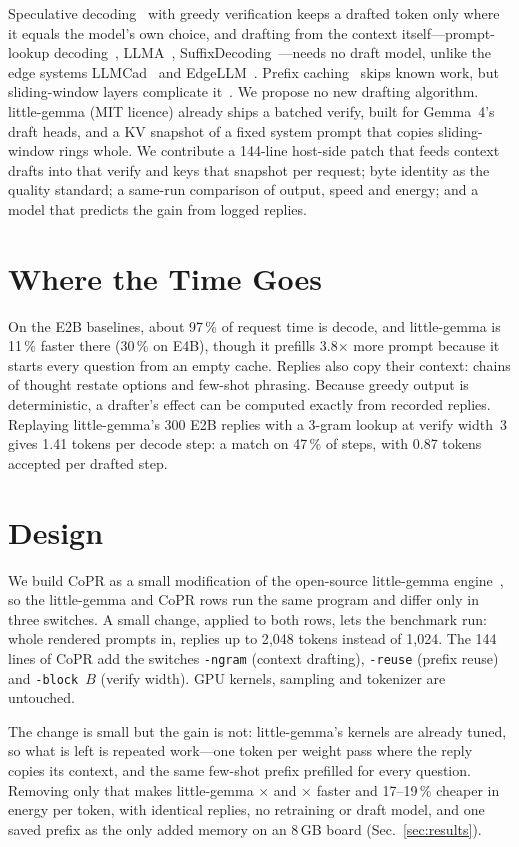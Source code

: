 \documentclass[lettersize,journal]{IEEEtran}
\newcommand{\sys}{CoPR}
\newcommand{\lgm}{little-gemma}
\begin{document}
Speculative decoding~\cite{leviathan2023,chen2023} with greedy verification keeps
a drafted token only where it equals the model's own choice, and drafting from the
context itself---prompt-lookup decoding~\cite{pld}, LLMA~\cite{llma},
SuffixDecoding~\cite{suffixdecoding}---needs no draft model, unlike the edge
systems LLMCad~\cite{llmcad} and EdgeLLM~\cite{edgellm}. Prefix
caching~\cite{vllm,sglang} skips known work, but sliding-window layers complicate
it~\cite{vllmhybrid}. We propose no new drafting algorithm. \lgm{} (MIT licence)
already ships a batched verify, built for Gemma~4's draft heads, and a KV snapshot
of a fixed system prompt that copies sliding-window rings whole. We contribute a
144-line host-side patch that feeds context drafts into that verify and keys
that snapshot per request; byte identity as the quality standard; a same-run
comparison of output, speed and energy; and a model that predicts the
gain from logged replies.

\section{Where the Time Goes}\label{sec:where}
On the E2B baselines, about 97\,\% of request time is decode, and \lgm{} is 11\,\%
faster there (30\,\% on E4B), though it prefills 3.8$\times$ more prompt because it
starts every question from an empty cache. Replies also copy their context: chains
of thought restate options and few-shot phrasing. Because greedy output is
deterministic, a drafter's effect can be computed exactly from recorded replies.
Replaying \lgm{}'s 300 E2B replies with a 3-gram lookup at verify width~3 gives 1.41
tokens per decode step: a match on 47\,\% of steps, with 0.87 tokens accepted per
drafted step.

\section{Design}\label{sec:design}
We build \sys{} as a small modification of the open-source \lgm{}
engine~\cite{littlegemmarepo}, so the \lgm{} and
\sys{} rows run the same program and differ only in three switches.
A small change, applied to both rows, lets the benchmark run: whole rendered
prompts in, replies up to 2{,}048 tokens instead of 1{,}024. The 144 lines of
\sys{} add the switches \texttt{-ngram} (context drafting), \texttt{-reuse}
(prefix reuse) and \texttt{-block}~$B$ (verify width). GPU kernels, sampling and
tokenizer are untouched.

The change is small but the gain is not: \lgm{}'s kernels are already tuned, so
what is left is repeated work---one token per weight pass where the reply
copies its context, and the same few-shot prefix prefilled for every question.
Removing only that makes \lgm{} \EtwoSpG$\times$ and \EfourSpG$\times$ faster
and 17--19\,\% cheaper in energy per token, with identical replies, no
retraining or draft model, and one saved prefix as the only added memory on an
8\,GB board
(Sec.~\ref{sec:results}).
\end{document}
